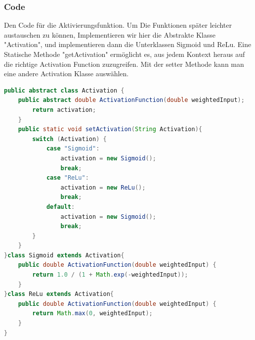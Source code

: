\documentclass[12pt]{article}
\begin{document}
\subsubsection{Code}Den Code für die Aktivierungsfunktion. Um Die Funktionen später leichter austauschen zu können, Implementieren wir hier die Abstrakte Klasse "Activation", und implementieren dann die Unterklassen Sigmoid und ReLu. Eine Statische Methode "getActivation" ermöglicht es, aus jedem Kontext heraus auf die richtige Activation Function zuzugreifen. Mit der setter Methode kann man eine andere Activation Klasse auswählen.\begin{lstlisting}[language=Java]
public abstract class Activation {
    public abstract double ActivationFunction(double weightedInput);    static Activation activation = new Sigmoid();    public static Activation geActivation(){
        return activation;
    }
    public static void setActivation(String Activation){
        switch (Activation) {
            case "Sigmoid":
                activation = new Sigmoid();
                break;
            case "ReLu":
                activation = new ReLu();
                break;
            default:
                activation = new Sigmoid();
                break;
        }
    }
}class Sigmoid extends Activation{
    public double ActivationFunction(double weightedInput) {
        return 1.0 / (1 + Math.exp(-weightedInput));
    }
}class ReLu extends Activation{
    public double ActivationFunction(double weightedInput) {
        return Math.max(0, weightedInput);
    }
}
\end{lstlisting}
\end{document}
